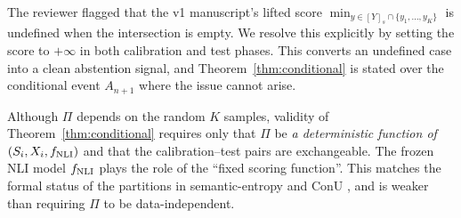 \begin{remark}
\label{rem:abstain}
The reviewer flagged that the v1 manuscript's lifted score
$\min_{y \in [Y]_s \cap \{y_1, \dots, y_K\}}$ is undefined when the
intersection is empty. We resolve this explicitly by setting the score to
$+\infty$ in both calibration and test phases. This converts an undefined
case into a clean abstention signal, and Theorem~\ref{thm:conditional} is
stated over the conditional event $A_{n+1}$ where the issue cannot arise.
\end{remark}

\begin{remark}
\label{rem:partition}
Although $\Pi$ depends on the random $K$ samples, validity of
Theorem~\ref{thm:conditional} requires only that $\Pi$ be \emph{a
deterministic function of $(S_i, X_i, f_{\rm NLI})$} and that the
calibration--test pairs are exchangeable. The frozen NLI model
$f_{\rm NLI}$ plays the role of the ``fixed scoring function''. This
matches the formal status of the partitions in semantic-entropy
\citep{kuhn2023semantic} and ConU \citep{wang2024conu}, and is weaker
than requiring $\Pi$ to be data-independent.
\end{remark}
